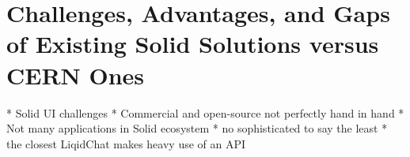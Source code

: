 \section{Challenges, Advantages, and Gaps of Existing Solid Solutions versus CERN Ones}

* Solid UI challenges
* Commercial and open-source not perfectly hand in hand
* Not many applications in Solid ecosystem
    * no sophisticated to say the least
    * the closest LiqidChat makes heavy use of an API